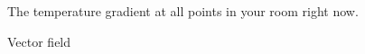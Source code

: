 The temperature gradient at all points in your room right now.

\begin{solution}
    Vector field
\end{solution}
